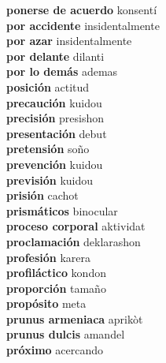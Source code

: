 \textbf{ ponerse de acuerdo  } konsentí \\
\textbf{ por accidente  } insidentalmente \\
\textbf{ por azar  } insidentalmente \\
\textbf{ por delante  } dilanti \\
\textbf{ por lo demás  } ademas \\
\textbf{ posición  } actitud \\
\textbf{ precaución  } kuidou \\
\textbf{ precisión  } presishon \\
\textbf{ presentación  } debut \\
\textbf{ pretensión  } soño \\
\textbf{ prevención  } kuidou \\
\textbf{ previsión  } kuidou \\
\textbf{ prisión  } cachot \\
\textbf{ prismáticos  } binocular \\
\textbf{ proceso corporal  } aktividat \\
\textbf{ proclamación  } deklarashon \\
\textbf{ profesión  } karera \\
\textbf{ profiláctico  } kondon \\
\textbf{ proporción  } tamaño \\
\textbf{ propósito  } meta \\
\textbf{ prunus armeniaca  } aprikòt \\
\textbf{ prunus dulcis  } amandel \\
\textbf{ próximo  } acercando \\
